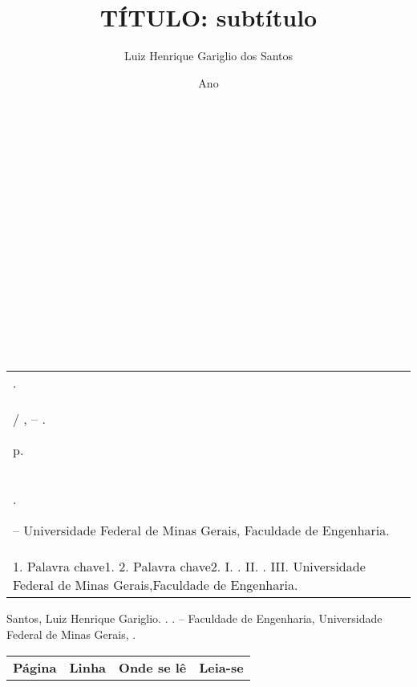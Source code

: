 \documentclass[12pt,a4paper,oneside]{abntex2}
\author{Luiz Henrique Gariglio dos Santos}
\title{TÍTULO: subtítulo}
\date{Ano}
\renewcommand{\imprimircapa}{
	\begin{capa}
		\center 
		{\normalsize \textbf{\imprimirinstituicao} }\\[5cm]
		{\normalsize\imprimirautor}\\[4cm]
		{\normalsize\textbf{\imprimirtitulo}}\\
		\vfill
		{\normalsize\imprimirlocal}\\
		{\normalsize\imprimirdata}\\
		
	\end{capa}
}
\newcommand{\folhaderostonova}{
	\center 
	{\normalsize \imprimirautor } \\[5cm]
	{\normalsize \imprimirtitulo} \\[4.5cm]
	\hspace{.45 \textwidth} %
	\begin{minipage}{.5\textwidth}
		\imprimirpreambulo \\ \\
		\imprimirorientadorRotulo \imprimirorientador \\ \\
		\imprimircoorientadorRotulo \imprimircoorientador
	\end{minipage}
	\center
	\vfill
	{\normalsize \imprimirlocal } \\
	{\normalsize \imprimirdata}
}
\begin{document}
	\imprimircapa
	\folhaderostonova
	\newpage
	\begin{fichacatalografica}
		\vspace*{\fill}
		\begin{table}[h]
			\footnotesize %
			\begin{tabular}{|p{12.5cm}|}
				\hline
				\imprimirautor.\\
				
				\hspace{0.5cm} \imprimirtitulo / \imprimirautor, -- \imprimirdata.
				
				\hspace{0.5cm} \pageref{LastPage} p. \\
				
				\hspace{0.5cm} \imprimirorientadorRotulo \imprimirorientador.
				
				\hspace{0.5cm} \imprimirtipotrabalho -- Universidade Federal de Minas Gerais, Faculdade de Engenharia.\\
				
				\hspace{0.5cm}
				1. Palavra chave1.
				2. Palavra chave2.
				I. \imprimirtitulo.
				II. \imprimirorientador.
				III. Universidade Federal de Minas Gerais,Faculdade de Engenharia. \\
				\hline
			\end{tabular}
		\end{table}
		
	\end{fichacatalografica}
	
	\begin{errata}
		\flushleftright
		Santos, Luiz Henrique Gariglio. \textbf{\imprimirtitulo}. \imprimirdata. \imprimirtipotrabalho -- Faculdade de Engenharia, Universidade Federal de Minas Gerais, \imprimirlocal.
		
		\begin{table}[htb]
			\center
			\footnotesize
			\begin{tabular}{p{1.4cm}p{1cm}p{3cm}p{3cm}}
				\textbf{Página} & \textbf{Linha} & \textbf{Onde se lê}  & \textbf{Leia-se}
			\end{tabular}
		\end{table}
	\end{errata}
	
\end{document}
